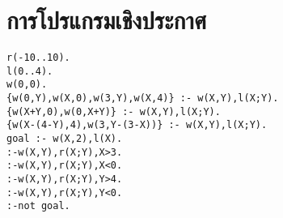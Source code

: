 \section{การโปรแกรมเชิงประกาศ}
%
%
%


\begin{lstlisting}[xleftmargin=1em]
r(-10..10).
l(0..4).
w(0,0).
{w(0,Y),w(X,0),w(3,Y),w(X,4)} :- w(X,Y),l(X;Y).
{w(X+Y,0),w(0,X+Y)} :- w(X,Y),l(X;Y).
{w(X-(4-Y),4),w(3,Y-(3-X))} :- w(X,Y),l(X;Y).
goal :- w(X,2),l(X).
:-w(X,Y),r(X;Y),X>3.
:-w(X,Y),r(X;Y),X<0.
:-w(X,Y),r(X;Y),Y>4.
:-w(X,Y),r(X;Y),Y<0.
:-not goal.
\end{lstlisting}





